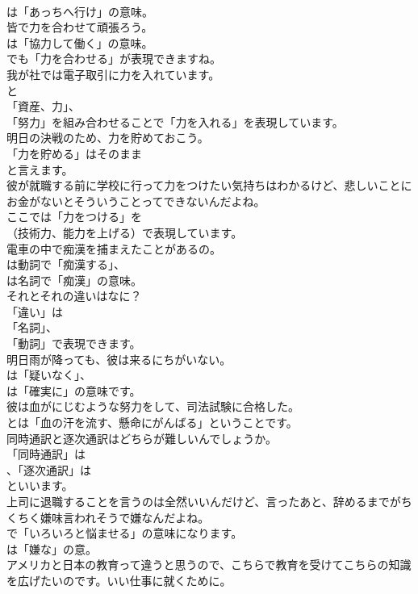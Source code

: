\documentclass[8pt]{extreport}
\begin{document}
\begin{CJK}{UTF8}{min}
\\	は「あっちへ行け」の意味。	
\\	皆で力を合わせて頑張ろう。 
\\	は「協力して働く」の意味。
\\	でも「力を合わせる」が表現できますね。	
\\	我が社では電子取引に力を入れています。 
\\	と
\\	「資産、力」、
\\	「努力」を組み合わせることで「力を入れる」を表現しています。	
\\	明日の決戦のため、力を貯めておこう。 
\\	「力を貯める」はそのまま
\\	と言えます。	
\\	彼が就職する前に学校に行って力をつけたい気持ちはわかるけど、悲しいことにお金がないとそういうことってできないんだよね。 
\\	ここでは「力をつける」を 
\\	（技術力、能力を上げる）で表現しています。	
\\	電車の中で痴漢を捕まえたことがあるの。 
\\	は動詞で「痴漢する」、
\\	は名詞で「痴漢」の意味。	
\\	それとそれの違いはなに？ 
\\	「違い」は
\\	「名詞」、
\\	「動詞」で表現できます。	
\\	明日雨が降っても、彼は来るにちがいない。 
\\	は「疑いなく」、
\\	は「確実に」の意味です。	
\\	彼は血がにじむような努力をして、司法試験に合格した。 
\\	とは「血の汗を流す、懸命にがんばる」ということです。	
\\	同時通訳と逐次通訳はどちらが難しいんでしょうか。 
\\	「同時通訳」は
\\	、「逐次通訳」は
\\	といいます。	
\\	上司に退職することを言うのは全然いいんだけど、言ったあと、辞めるまでがちくちく嫌味言われそうで嫌なんだよね。 
\\	で「いろいろと悩ませる」の意味になります。
\\	は「嫌な」の意。	
\\	アメリカと日本の教育って違うと思うので、こちらで教育を受けてこちらの知識を広げたいのです。いい仕事に就くために。 

\end{CJK}
\end{document}
